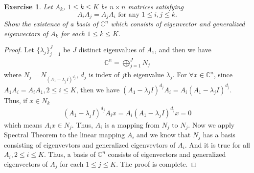 \documentclass[10pt]{book}
\newtheorem{exercise}{Exercise}[section]
\theoremstyle{definition}
\numberwithin{equation}{chapter}
\begin{document}
\begin{exercise}\label{generalized_eigenvectors}
Let $A_{k}$, $1\leq k\leq K$ be $n\times n$ matrices satisfying%
$$
A_{i}A_{j}=A_{j}A_{i}\text{ for any }1\leq i,j\leq k.
$$
Show the existence of a basis of $\mathbb{C}^{n}$ which consists of
eigenvector and generalized eigenvectors of $A_{k}$ for each $1\leq k\leq K$.
\end{exercise}
\begin{proof}
Let $\{\lambda_j\}^J_{j=1}$ be $J$ distinct eigenvalues of $A_1$, and then we have
\begin{align*}
    \mathbb{C}^n = \bigoplus^J_{j=1}N_j
\end{align*}
where $N_j=N_{(A_1-\lambda_j I)^{d_j}}$, $d_j$ is index of $j$th eigenvalue $\lambda_j$. For $\forall x\in\mathbb{C}^n$, since $A_1 A_i=A_i A_1,2\leq i \leq K$, then we have $(A_1-\lambda_j I)^{d_j}A_i=A_i(A_1-\lambda_j I)^{d_j}$. Thus, if $x\in N_k$
\begin{align*}
    (A_1-\lambda_j I)^{d_j}A_ix =A_i(A_1-\lambda_j I)^{d_j}x = 0
\end{align*}
which means $A_i x\in N_j$. Thus, $A_i$ is a mapping from $N_j$ to $N_j$. Now we apply Spectral Theorem to the linear mapping $A_i$ and we know that $N_j$ has a basis consisting of eigenvevtors and generalized eigenvevtors of $A_i$. And it is true for all $A_i, 2\leq i \leq K$. Thus, a basis of $\mathbb{C}^{n}$ consists of
eigenvectors and generalized eigenvectors of $A_{j}$ for each $1\leq j\leq K$. The proof is complete.
\end{proof}

\medskip
\end{document}

